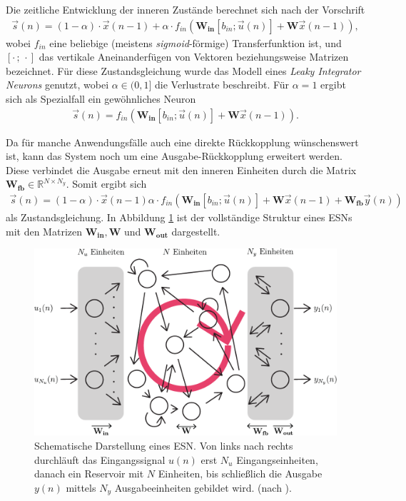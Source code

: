 Die zeitliche Entwicklung der inneren Zustände berechnet sich nach der Vorschrift
\begin{align}
\label{eq:esn_stateeq}
\vec{s}(n) = (1 - \alpha) \cdot \vec{x}(n-1)  + \alpha \cdot f_{in}\left( \mathbf{W_{in}} [b_{in}; \vec{u}(n)] + \mathbf{W} \vec{x}(n-1) \right),
\end{align}
wobei $f_{in}$ eine beliebige (meistens \textit{sigmoid}-förmige) Transferfunktion ist, und $[\cdot\,;\,\cdot]$ das vertikale Aneinanderfügen von Vektoren beziehungsweise Matrizen bezeichnet. Für diese Zustandsgleichung wurde das Modell eines \textit{Leaky Integrator Neurons} genutzt, wobei $\alpha \in (0,1]$ die Verlustrate beschreibt. Für $\alpha=1$ ergibt sich als Spezialfall ein gewöhnliches Neuron
\begin{align}
\vec{s}(n) = f_{in}\left( \mathbf{W_{in}} [b_{in}; \vec{u}(n)] + \mathbf{W} \vec{x}(n-1) \right).
\end{align}

Da für manche Anwendungsfälle auch eine direkte Rückkopplung wünschenswert ist, kann das System noch um eine Ausgabe-Rückkopplung erweitert werden. Diese verbindet die Ausgabe erneut mit den inneren Einheiten durch die Matrix $\mathbf{W_{fb}} \in \mathbb{R}^{N \times N_y}$.
Somit ergibt sich 
\begin{align}
\label{eq:esn_stateeq_feedback}
\vec{s}(n) = (1 - \alpha) \cdot \vec{x}(n-1)  \alpha \cdot f_{in}\left( \mathbf{W_{in}} [b_{in}; \vec{u}(n)] + \mathbf{W} \vec{x}(n-1) + \mathbf{W_{fb}} \vec{y}(n) \right)
\end{align}
als Zustandsgleichung. In Abbildung \ref{fig:esn_structure} ist der vollständige Struktur eines \textsc{ESN}s mit den Matrizen $\mathbf{W_{in}}, \mathbf{W}$ und $\mathbf{W_{out}}$ dargestellt.

\begin{figure}[H]
    \centering
    \includegraphics[width = 0.7 \textwidth]{figures/illustrations/esn_structure.pdf}
    \caption{Schematische Darstellung eines \textsc{ESN}. Von links nach rechts durchläuft das Eingangssignal $u(n)$ erst $N_u$ Eingangseinheiten, danach ein Reservoir mit $N$ Einheiten, bis schließlich die Ausgabe $y(n)$ mittels $N_y$ Ausgabeeinheiten gebildet wird. (nach \citep{jeagerTut2002, Ma2013}).}
    \label{fig:esn_structure}
\end{figure}


